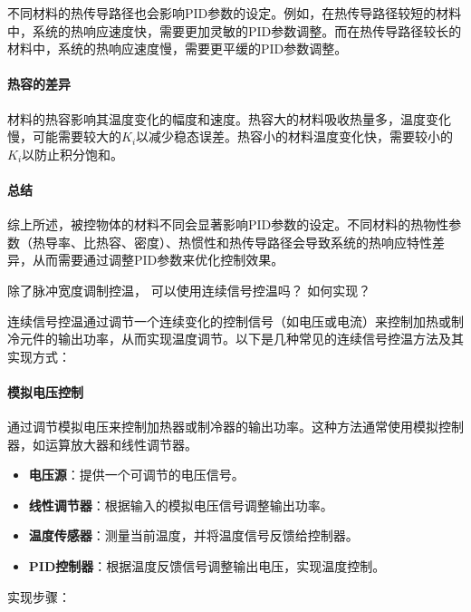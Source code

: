 \documentclass[dvipsnames, svgnames,a4paper,11pt]{article}
\begin{document}
不同材料的热传导路径也会影响PID参数的设定。例如，在热传导路径较短的材料中，系统的热响应速度快，需要更加灵敏的PID参数调整。而在热传导路径较长的材料中，系统的热响应速度慢，需要更平缓的PID参数调整。

\paragraph*{热容的差异}

材料的热容影响其温度变化的幅度和速度。热容大的材料吸收热量多，温度变化慢，可能需要较大的$K_i$以减少稳态误差。热容小的材料温度变化快，需要较小的$K_i$以防止积分饱和。

\paragraph*{总结}

综上所述，被控物体的材料不同会显著影响PID参数的设定。不同材料的热物性参数（热导率、比热容、密度）、热惯性和热传导路径会导致系统的热响应特性差异，从而需要通过调整PID参数来优化控制效果。




\begin{question}
	除了脉冲宽度调制控温， 可以使用连续信号控温吗？ 如何实现？
\end{question}



连续信号控温通过调节一个连续变化的控制信号（如电压或电流）来控制加热或制冷元件的输出功率，从而实现温度调节。以下是几种常见的连续信号控温方法及其实现方式：

\paragraph*{模拟电压控制}

通过调节模拟电压来控制加热器或制冷器的输出功率。这种方法通常使用模拟控制器，如运算放大器和线性调节器。

\begin{itemize}
    \item \textbf{电压源}：提供一个可调节的电压信号。
    \item \textbf{线性调节器}：根据输入的模拟电压信号调整输出功率。
    \item \textbf{温度传感器}：测量当前温度，并将温度信号反馈给控制器。
    \item \textbf{PID控制器}：根据温度反馈信号调整输出电压，实现温度控制。
\end{itemize}

实现步骤：
\end{document}
